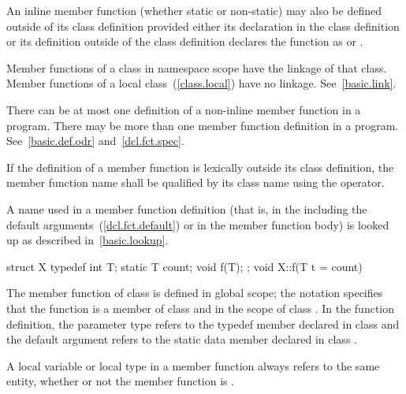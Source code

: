 \pnum
An inline member function (whether static or non-static) may
also be defined outside of its class definition provided either its
declaration in the class definition or its definition outside of the
class definition declares the function as  or .
\begin{note}
Member functions of a class in namespace scope have the linkage of that class.
Member functions of a local class~(\ref{class.local}) have no linkage.
See~\ref{basic.link}.
\end{note}

\pnum
\begin{note}
There can be at most one definition of a non-inline member function in
a program. There may be more than one
 member function definition in a program.
See~\ref{basic.def.odr} and~\ref{dcl.fct.spec}.
\end{note}

\pnum
{}%
If the definition of a member function is lexically outside its class
definition, the member function name shall be qualified by its class
name using the \tcode{::} operator.
\begin{note}
A name used in a member function definition (that is, in the
 including the default
arguments~(\ref{dcl.fct.default}) or in the member function body) is looked up
as described in~\ref{basic.lookup}.
\end{note}
\begin{example}

\begin{codeblock}
struct X {
  typedef int T;
  static T count;
  void f(T);
};
void X::f(T t = count) { }
\end{codeblock}

The member function  of class  is defined in global
scope; the notation  specifies that the function 
is a member of class  and in the scope of class . In
the function definition, the parameter type  refers to the
typedef member  declared in class  and the default
argument  refers to the static data member 
declared in class .
\end{example}

\pnum
\begin{note}
A  local variable or local type in a member function always refers to
the same entity, whether or not the member function is .
\end{note}


